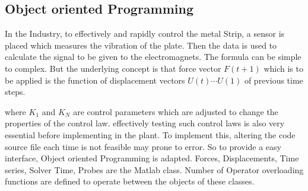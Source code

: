 \documentclass[main.tex]{subfiles}
\begin{document}
\begin{comment}

[\textbf{insert simulink strucutr}]




\begin{equation}
u = \overline{u} e^{i \omega t}
\end{equation}

$\overline{u}$ is the natural mode. $\omega$ is the natural mode of the system.

using orthoganlity [\textbf{bla bla bla}], the system is reduced into as

\begin{equation}
 \left[  \overline{ K } \right]  =   \left\{ \overline{u}  \right\} ^ T
 \left[K\right] 
  \left\{ \overline{u}  \right\} 
\end{equation}

\begin{equation}
 \left[  \overline{ C } \right]  =   \left\{ \overline{u}  \right\} ^ T
 \left[C\right] 
  \left\{ \overline{u}  \right\} 
\end{equation}

\begin{equation}
 \left[  \overline{ M } \right]  =   \left\{ \overline{u}  \right\} ^ T
 \left[M\right] 
  \left\{ \overline{u}  \right\} 
\end{equation}

[write full reduced ODE]

By doing this, the efficiency of the system increases drastically. 

\end{comment}
\subsection{Object oriented Programming}

In the Industry, to effectively and rapidly control the metal Strip, a sensor is placed which measures the vibration of the plate. Then the data is used to calculate the signal to be given to the electromagnets. The formula can be simple to complex. But the underlying concept is that force vector $F(t+1)$ which is to be applied is the function of displacement vectors $U(t) \cdots U(1)$ of previous time steps.




where $K_1$ and $K_N$ are control parameters which are adjusted to change the properties of the control law. effectively testing such control laws is also very essential before implementing in the plant. To implement this, altering the code source file each time is not feasible may prone to error. So to provide a easy interface, Object oriented Programming is adapted. Forces, Displacements, Time series, Solver Time, Probes are the Matlab class. Number of Operator overloading functions are defined to operate between the objects of these classes. 
\end{document}
